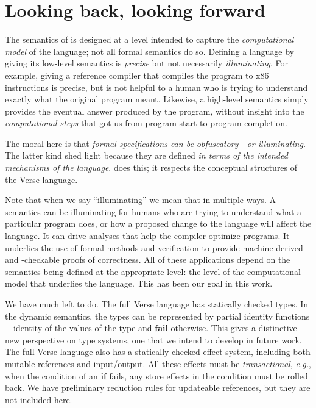 \documentclass[acmsmall,review,anonymous,dvipsnames]{acmart}
\newcommand{\eg}{\emph{e.g.}}
\begin{document}
\section{Looking back, looking forward}

The semantics of \versecalc{} is designed at a level intended to capture the
\emph{computational model} of the language; not all formal semantics do so.
Defining a language by giving its low-level semantics is \emph{precise} but not necessarily \emph{illuminating}.
For example, giving a reference compiler that compiles
the program to x86 instructions is precise, but is not helpful
to a human who is trying to understand exactly what the original program
meant. Likewise, a high-level semantics simply provides the eventual answer
produced by the program, without insight into the \emph{computational steps}
that got us from program start to program completion.

The moral here is that \emph{formal specifications can be obfuscatory---or
illuminating.} The latter kind shed light because they are defined \emph{in
terms of the intended mechanisms of the language}. \versecalc{} does this; it
respects the conceptual structures of the Verse language.

Note that when we say ``illuminating'' we mean that in multiple ways.
A semantics can be illuminating for humans who are trying to understand
what a particular program does, or how a proposed change to the language
will affect the language. It can drive analyses that help the compiler
optimize programs. It underlies the use of formal methods and verification
to provide machine-derived and -checkable proofs of correctness. All of
these applications depend on the semantics being defined at the appropriate
level: the level of the computational model that underlies the language.
This has been our goal in this work.

We have much left to do.  The full Verse language has
statically checked types.  In the dynamic semantics, the types can be
represented by partial identity functions---identity of the values of
the type and \ensuremath{\textbf{fail}} otherwise.  This gives a distinctive new
perspective on type systems, one that we intend to develop in future
work.  The full Verse language also has a statically-checked effect system,
including both mutable references and input/output.  All these effects
must be \emph{transactional}, {\eg}, when the condition of an \ensuremath{\textbf{if}}
fails, any store effects in the condition must be rolled back.
We have preliminary reduction rules for updateable references,
but they are not included here.
\end{document}
